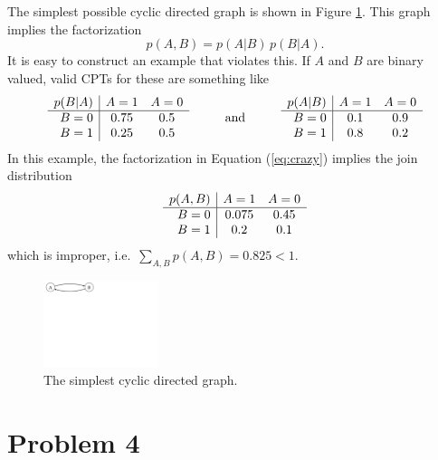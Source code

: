 \documentclass[11pt]{article}
\newcommand{\eq}[1]{Equation (\ref{eq:#1})}
\newcommand{\eqlabel}[1]{\label{eq:#1}}
\newcommand{\fig}[1]{Figure \ref{fig:#1}}
\newcommand{\figlabel}[1]{\label{fig:#1}}
\newcommand{\pr}[1]{\ensuremath{p(#1)}}
\begin{document}
The simplest possible cyclic directed graph is shown in \fig{cycle}. This
graph implies the factorization
\begin{equation}\eqlabel{crazy}
    \pr{A,B} = \pr{A|B} \, \pr{B|A}.
\end{equation}
It is easy to construct an example that violates this. If $A$ and $B$ are
binary valued, valid CPTs for these are something like
\begin{equation}
    \begin{array}{r | cc}
        \pr{B | A} & A = 1 & A = 0 \\ \hline
        B = 0 & 0.75 & 0.5 \\
        B = 1 & 0.25 & 0.5
    \end{array} \hspace{1cm} \mathrm{and} \hspace{1cm}
    \begin{array}{r | cc}
        \pr{A | B} & A = 1 & A = 0 \\ \hline
        B = 0 & 0.1 & 0.9 \\
        B = 1 & 0.8 & 0.2
    \end{array}
\end{equation}
In this example, the factorization in \eq{crazy} implies the join
distribution
\begin{equation}
    \begin{array}{r | cc}
        \pr{A, B} & A = 1 & A = 0 \\ \hline
        B = 0 & 0.075 & 0.45 \\
        B = 1 & 0.2 & 0.1
    \end{array}
\end{equation}
which is improper, i.e.~$\sum_{A,B} \pr{A,B} = 0.825 < 1$.

\begin{figure}[hbtp]
    \centering
    \includegraphics[width=0.3\textwidth]{cycle.pdf}
    \caption{The simplest cyclic directed graph. \figlabel{cycle}}
\end{figure}

\section{Problem 4}
\end{document}
